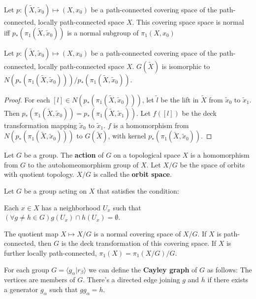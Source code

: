 \documentclass[12pt]{book}
\begin{document}
\begin{lemma}
	Let $p:(\tilde X,\tilde x_0)\mapsto(X,x_0)$ be a path-connected covering space of the path-connected, locally path-connected space $X$. This covering space space is normal iff $p_*(\pi_1(\tilde X,\tilde x_0))$ is a normal subgroup of $\pi_1(X,x_0)$
\end{lemma}

\begin{lemma}
	Let $p:(\tilde X,\tilde x_0)\mapsto(X,x_0)$ be a path-connected covering space of the path-connected, locally path-connected space $X$. $G(\tilde X)$ is isomorphic to $N(p_*(\pi_1(\tilde X,\tilde x_0)))/p_*(\pi_1(\tilde X,\tilde x_0))$.
\end{lemma}
\begin{proof}
	For each $[l]\in N(p_*(\pi_1(\tilde X,\tilde x_0)))$, let $\tilde l$ be the lift in $\tilde X$ from $\tilde x_0$ to $\tilde x_1$. Then $p_*(\pi_1(\tilde X,\tilde x_0))=p_*(\pi_1(\tilde X,\tilde x_1))$. Let $f([l])$ be the deck transformation mapping $\tilde x_0$ to $\tilde x_1$. $f$ is a homomorphism from $N(p_*(\pi_1(\tilde X,\tilde x_0)))$ to $G(\tilde X)$, with kernel $p_*(\pi_1(\tilde X,\tilde x_0))$.
\end{proof}

\begin{definition}
	Let $G$ be a group. The {\bf action} of $G$ on a topological space $X$ is a homomorphism from $G$ to the autohomeomorphism group of $X$. Let $X/G$ be the space of orbits with quotient topology. $X/G$ is called the {\bf orbit space}.
\end{definition}

\begin{lemma}
	Let $G$ be a group acting on $X$ that satisfies the condition:
	
	Each $x\in X$ has a neighborhood $U_x$ such that $(\forall g\neq h\in G)g(U_x)\cap h(U_x)=\emptyset$. 
	
	The quotient map $X\mapsto X/G$ is a normal covering space of $X/G$. If $X$ is path-connected, then $G$ is the deck transformation of this covering space. If $X$ is further locally path-connected, $\pi_1(X)=\pi_1(X/G)/G$.
\end{lemma}

\begin{definition}
	For each group $G=\langle g_\alpha|r_\beta\rangle$ we can define the {\bf Cayley graph} of $G$ as follows: The vertices are members of $G$. There's a directed edge joining $g$ and $h$ if there exists a generator $g_\alpha$ such that $gg_\alpha=h$.
\end{definition}
\end{document}
